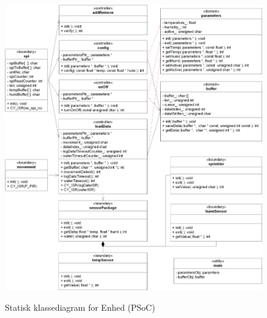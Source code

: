 
\begin{figure}[!htbp] \centering
{\includegraphics[scale=0.7]{filer/implementering/sw_class_psoc_static}}
\caption{Statisk klassediagram for Enhed (PSoC)}
\label{fig:class_psoc_static_dev}
\end{figure}

